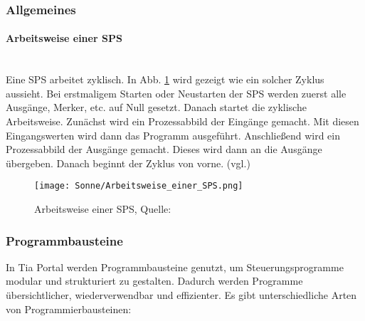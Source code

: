 \begin{minipage}{\textwidth}
    
    \vspace{10mm}

    \subsubsection{Allgemeines}

        \paragraph{Arbeitsweise einer SPS} \mbox{} \\
        Eine SPS arbeitet zyklisch. In Abb. \ref{Arbeitsweise_einer_SPS} wird gezeigt wie ein solcher Zyklus aussieht. Bei erstmaligem Starten oder Neustarten der SPS werden zuerst alle Ausgänge, Merker, etc. auf Null gesetzt. Danach startet die zyklische Arbeitsweise. Zunächst wird ein Prozessabbild der Eingänge gemacht. Mit diesen Eingangswerten wird dann das Programm ausgeführt. Anschließend wird ein Prozessabbild der Ausgänge gemacht. Dieses wird dann an die Ausgänge übergeben. Danach beginnt der Zyklus von vorne. (vgl.\cite{Arbeitsweise_der_SPS})

    \end{minipage}
        \begin{figure}[H]
            \texttt{[image: Sonne/Arbeitsweise\_einer\_SPS.png]}
            \caption{Arbeitsweise einer SPS, Quelle: \cite{Arbeitsweise_der_SPS}}
            \label{Arbeitsweise_einer_SPS}
        \end{figure}


    \subsubsection[Programmbausteine]
    {Programmbausteine}
    
    In Tia Portal werden Programmbausteine genutzt, um Steuerungsprogramme modular und strukturiert zu gestalten. Dadurch werden Programme übersichtlicher, wiederverwendbar und effizienter. Es gibt unterschiedliche Arten von Programmierbausteinen:

